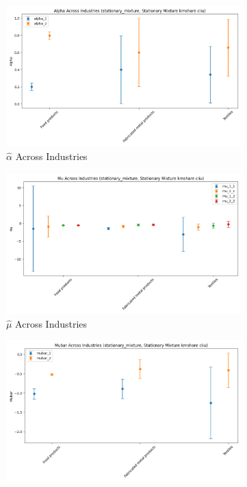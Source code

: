 \documentclass{article}
\begin{document}
\begin{figure}[ht!]
    \centering 
    \caption{Stationary Mixture Model with $\log K$, Import and CIIU Across Industries}
    \begin{subfigure}[t]{0.32\textwidth}
        \centering
        \includegraphics[width=\textwidth]{figure/stationary_mixture_kmshare_ciiu_alpha_across_industries.png}
        \caption{$\hat\alpha$ Across Industries}
    \end{subfigure}
    \begin{subfigure}[t]{0.32\textwidth}
        \centering
        \includegraphics[width=\textwidth]{figure/stationary_mixture_kmshare_ciiu_mu_across_industries.png}
        \caption{$\hat\mu$ Across Industries}
    \end{subfigure}
    \begin{subfigure}[t]{0.32\textwidth}
        \centering
        \includegraphics[width=\textwidth]{figure/stationary_mixture_kmshare_ciiu_mubar_across_industries.png}

\end{subfigure}
\end{figure}
\end{document}
